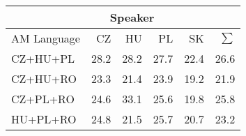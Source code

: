 \begin{tabular}{l|rrrr|r}
\hline
 & \multicolumn{3}{c}{Speaker} & \\
\hline
 AM Language   &   CZ &   HU &   PL &   SK &   $\sum$ \\
\hline
 CZ+HU+PL      & 28.2 & 28.2 & 27.7 & 22.4 &     26.6 \\
 CZ+HU+RO      & 23.3 & 21.4 & 23.9 & 19.2 &     21.9 \\
 CZ+PL+RO      & 24.6 & 33.1 & 25.6 & 19.8 &     25.8 \\
 HU+PL+RO      & 24.8 & 21.5 & 25.7 & 20.7 &     23.2 \\
\hline
\end{tabular}